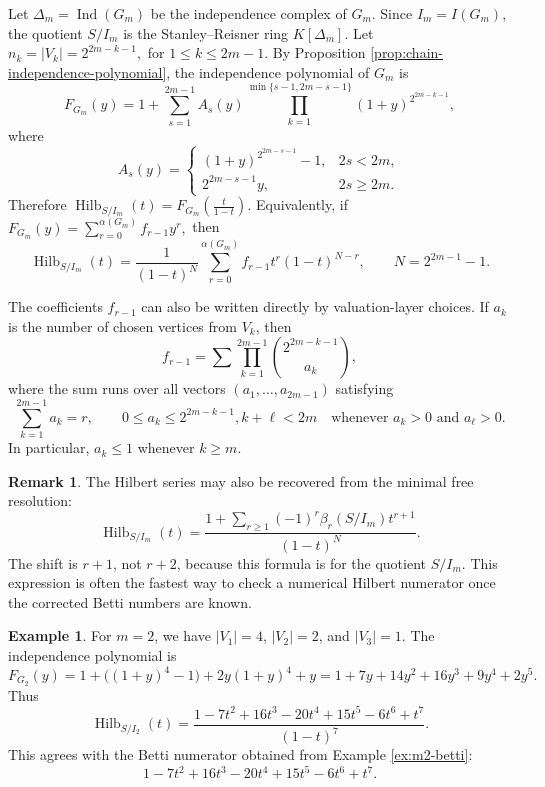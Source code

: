 \documentclass[12pt]{article}
\theoremstyle{definition}
\newtheorem{example}[theorem]{Example}
\newtheorem{remark}[theorem]{Remark}
\begin{document}
\medskip

Let $\Delta_m=\operatorname{Ind}(G_m)$ be the independence complex of $G_m$.  Since $I_m=I(G_m)$, the quotient $S/I_m$ is the Stanley--Reisner ring $K[\Delta_m]$. Let $ n_k=|V_k|=2^{2m-k-1},$ for $ 1\leq k\leq 2m-1. $
By Proposition \ref{prop:chain-independence-polynomial}, the independence polynomial of $G_m$ is
$$
F_{G_m}(y)=1+\sum_{s=1}^{2m-1}A_s(y)\prod_{k=1}^{\min\{s-1,2m-s-1\}}(1+y)^{2^{2m-k-1}},
$$
where
$$
A_s(y)=
\begin{cases}
	(1+y)^{2^{2m-s-1}}-1, & 2s<2m,\\[2pt]
	2^{2m-s-1}y, & 2s\geq 2m.
\end{cases}
$$
Therefore
$ \operatorname{Hilb}_{S/I_m}(t)=F_{G_m}\left(\frac{t}{1-t}\right).$ Equivalently, if
$ F_{G_m}(y)=\sum_{r=0}^{\alpha(G_m)}f_{r-1}y^r, $
then
$$
\operatorname{Hilb}_{S/I_m}(t)=\frac{1}{(1-t)^N}\sum_{r=0}^{\alpha(G_m)}f_{r-1}t^r(1-t)^{N-r},\qquad N=2^{2m-1}-1.
$$

\medskip

The coefficients $f_{r-1}$ can also be written directly by valuation-layer choices.  If $a_k$ is the number of chosen vertices from $V_k$, then
$$
f_{r-1}=\sum\prod_{k=1}^{2m-1}\binom{2^{2m-k-1}}{a_k},
$$
where the sum runs over all vectors $(a_1,\ldots,a_{2m-1})$ satisfying
$$
\sum_{k=1}^{2m-1}a_k=r,
\qquad
0\leq a_k\leq 2^{2m-k-1}, k+\ell<2m\quad\text{whenever }a_k>0\text{ and }a_\ell>0.
$$
In particular, $a_k\leq 1$ whenever $k\geq m$.

\medskip

\begin{remark}\label{rem:gaussian-hilbert-betti-check}
	The Hilbert series may also be recovered from the minimal free resolution:
	$$
	\operatorname{Hilb}_{S/I_m}(t)=
	\frac{1+\sum_{r\geq 1}(-1)^r\beta_r(S/I_m)t^{r+1}}{(1-t)^N}.
	$$
	The shift is $r+1$, not $r+2$, because this formula is for the quotient $S/I_m$.  This expression is often the fastest way to check a numerical Hilbert numerator once the corrected Betti numbers are known.
\end{remark}

\medskip

\begin{example}\label{ex:m2-hilbert}
	For $m=2$, we have $|V_1|=4$, $|V_2|=2$, and $|V_3|=1$.  The independence polynomial is
	$$
	F_{G_2}(y)=1+\bigl((1+y)^4-1\bigr)+2y(1+y)^4+y=1+7y+14y^2+16y^3+9y^4+2y^5.
	$$
	Thus
	$$
	\operatorname{Hilb}_{S/I_2}(t)=\frac{1-7t^2+16t^3-20t^4+15t^5-6t^6+t^7}{(1-t)^7}.
	$$
	This agrees with the Betti numerator obtained from Example \ref{ex:m2-betti}:
	$$
	1-7t^2+16t^3-20t^4+15t^5-6t^6+t^7.
	$$
\end{example}
\end{document}
